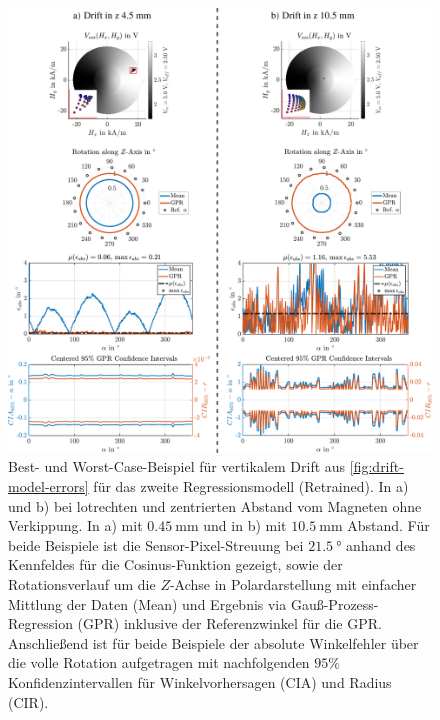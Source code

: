 \clearpage
\begin{figure}[tbph]
	\centering
	\includegraphics[width=\linewidth]{chapters/images/4-EuOExp/Z-Pos-Comp-45-105-Rotation}
	\caption[Best- und Worst-Case-Beispiel bei vertikalem Drift]{Best- und Worst-Case-Beispiel für vertikalem Drift aus \autoref{fig:drift-model-errors} für das zweite Regressionsmodell (Retrained). In a) und b) bei lotrechten und zentrierten Abstand vom Magneten ohne Verkippung. In a) mit $\SI{0,45}{\milli\metre}$ und in b) mit $\SI{10,5}{\milli\metre}$ Abstand. Für beide Beispiele ist die Sensor-Pixel-Streuung bei $\SI{21,5}{\degree}$ anhand des Kennfeldes für die Cosinus-Funktion gezeigt, sowie der Rotationsverlauf um die $Z$-Achse in Polardarstellung mit einfacher Mittlung der Daten (Mean) und Ergebnis via Gauß-Prozess-Regression (GPR) inklusive der Referenzwinkel für die GPR. Anschließend ist für beide Beispiele der absolute Winkelfehler über die volle Rotation aufgetragen mit nachfolgenden $95\%$ Konfidenzintervallen für Winkelvorhersagen (CIA) und Radius (CIR).}
	\label{fig:z-pos-comp-45-105-rotation}
\end{figure}


\clearpage

